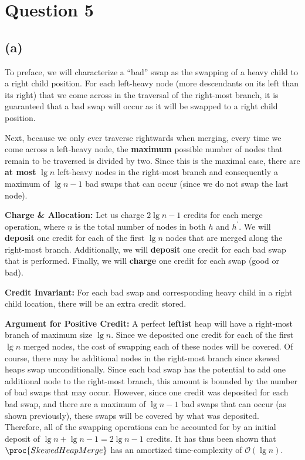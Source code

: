 \section{Question 5}
\subsection{(a)}

To preface, we will characterize a ``bad'' swap as the swapping of a heavy child to a right child position.
For each left-heavy node (more descendants on its left than its right) that we come across in
the traversal of the right-most branch, it is guaranteed that a bad swap will occur as it will be swapped to a right child position.\vspace{3mm}

Next, because we only ever traverse rightwards when merging, every time we come across a left-heavy node, the \textbf{maximum} possible number
of nodes that remain to be traversed is divided by two.
Since this is the maximal case, there are \textbf{at most} $\lg{n}$ left-heavy nodes in the right-most branch and consequently a maximum of $\lg{n} - 1$ bad swaps that can occur (since we do not swap the last node).\vspace{3mm}

\textbf{Charge \& Allocation:} Let us charge $2\lg{n} - 1$ credits for each merge operation, where $n$ is the total number of nodes in both $h$ and $h^\prime$.
We will \textbf{deposit} one credit for each of the first $\lg{n}$ nodes that are merged along the right-most branch.
Additionally, we will \textbf{deposit} one credit for each bad swap that is performed.
Finally, we will \textbf{charge} one credit for each swap (good or bad).

\textbf{Credit Invariant:} For each bad swap and corresponding heavy child in a right child location,
there will be an extra credit stored.

\textbf{Argument for Positive Credit:}
A perfect \textbf{leftist} heap will have a right-most branch of maximum size $\lg{n}$.
Since we deposited one credit for each of the first $\lg{n}$ merged nodes,
the cost of swapping each of these nodes will be covered.
Of course, there may be additional nodes in the right-most branch since skewed heaps swap unconditionally.
Since each bad swap has the potential to add one additional node to the right-most branch, this amount is bounded by
the number of bad swaps that may occur.
However, since one credit was deposited for each bad swap, and there are a maximum of $\lg{n} - 1$ bad swaps that can occur (as shown previously),
these swaps will be covered by what was deposited.\\
Therefore, all of the swapping operations can be accounted
for by an initial deposit of $\lg{n} + \lg{n} - 1 = 2\lg{n} - 1$ credits.
It has thus been shown that $\proc{SkewedHeapMerge}$ has an amortized time-complexity of $\mathcal{O}(\lg{n})$.

